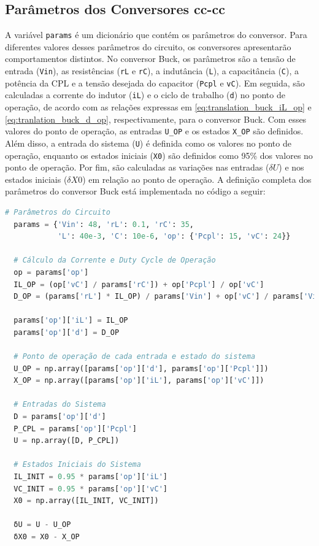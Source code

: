 \subsection{Parâmetros dos Conversores \acrshort{cc}-\acrshort{cc}}

A variável \texttt{params} é um dicionário que contém os parâmetros do conversor. Para diferentes valores desses parâmetros do circuito, os conversores apresentarão comportamentos distintos. No conversor Buck, os parâmetros são a tensão de entrada (\texttt{Vin}), as resistências (\texttt{rL} e \texttt{rC}), a indutância (\texttt{L}), a capacitância (\texttt{C}), a potência da CPL e a tensão desejada do capacitor (\texttt{Pcpl} e \texttt{vC}). Em seguida, são calculadas a corrente do indutor (\texttt{iL}) e o ciclo de trabalho (\texttt{d}) no ponto de operação, de acordo com as relações expressas em \eqref{eq:translation_buck_iL_op} e \eqref{eq:tranlation_buck_d_op}, respectivamente, para o conversor Buck. Com esses valores do ponto de operação, as entradas \texttt{U\_OP} e os estados \texttt{X\_OP} são definidos. Além disso, a entrada do sistema (\texttt{U}) é definida como os valores no ponto de operação, enquanto os estados iniciais (\texttt{X0}) são definidos como 95\% dos valores no ponto de operação. Por fim, são calculadas as variações nas entradas (\(\delta U\)) e nos estados iniciais ($\delta X0$) em relação ao ponto de operação. A definição completa dos parâmetros do conversor Buck está implementada no código a seguir: 

\vspace{8pt}
\begin{lstlisting}[language=Python, caption={Parâmetros do conversor Buck.}, label=cod:buck_params]
  # Parâmetros do Circuito
  params = {'Vin': 48, 'rL': 0.1, 'rC': 35,
            'L': 40e-3, 'C': 10e-6, 'op': {'Pcpl': 15, 'vC': 24}}

  # Cálculo da Corrente e Duty Cycle de Operação
  op = params['op']
  IL_OP = (op['vC'] / params['rC']) + op['Pcpl'] / op['vC']
  D_OP = (params['rL'] * IL_OP) / params['Vin'] + op['vC'] / params['Vin']

  params['op']['iL'] = IL_OP
  params['op']['d'] = D_OP

  # Ponto de operação de cada entrada e estado do sistema
  U_OP = np.array([params['op']['d'], params['op']['Pcpl']])
  X_OP = np.array([params['op']['iL'], params['op']['vC']])

  # Entradas do Sistema
  D = params['op']['d']
  P_CPL = params['op']['Pcpl']
  U = np.array([D, P_CPL])

  # Estados Iniciais do Sistema
  IL_INIT = 0.95 * params['op']['iL']
  VC_INIT = 0.95 * params['op']['vC']
  X0 = np.array([IL_INIT, VC_INIT])

  δU = U - U_OP
  δX0 = X0 - X_OP
\end{lstlisting}

